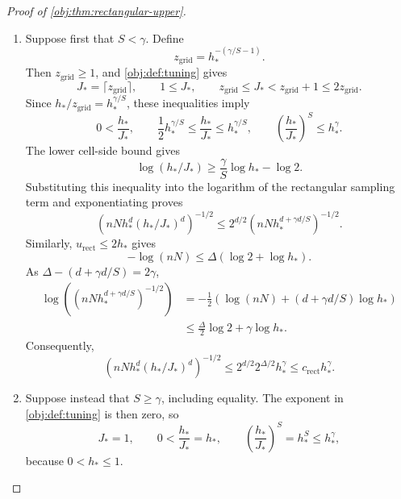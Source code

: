 \begin{proof}[Proof of \cref{obj:thm:rectangular-upper}]
\begin{enumerate}
\item Suppose first that \(S<\gamma\). Define
\[
z_{\mathrm{grid}}=h_*^{-(\gamma/S-1)}.
\]
Then \(z_{\mathrm{grid}}\ge1\), and \cref{obj:def:tuning} gives
\[
J_*=\lceil z_{\mathrm{grid}}\rceil,\qquad
1\le J_*,\qquad
z_{\mathrm{grid}}\le J_*<z_{\mathrm{grid}}+1
\le2z_{\mathrm{grid}}.
\]
Since \(h_*/z_{\mathrm{grid}}=h_*^{\gamma/S}\), these inequalities imply
\[
0<\frac{h_*}{J_*},\qquad
\frac12h_*^{\gamma/S}
\le\frac{h_*}{J_*}\le h_*^{\gamma/S},
\qquad
\left(\frac{h_*}{J_*}\right)^S\le h_*^\gamma.
\]
The lower cell-side bound gives
\[
\log(h_*/J_*)\ge\frac{\gamma}{S}\log h_*-\log2.
\]
Substituting this inequality into the logarithm of the rectangular sampling term and exponentiating proves
\[
\left(nNh_*^d(h_*/J_*)^d\right)^{-1/2}
\le
2^{d/2}
\left(nNh_*^{d+\gamma d/S}\right)^{-1/2}.
\]
Similarly, \(u_{\mathrm{rect}}\le2h_*\) gives
\[
-\log(nN)\le\Delta(\log2+\log h_*).
\]
As \(\Delta-(d+\gamma d/S)=2\gamma\),
\[
\begin{aligned}
\log\left(\left(nNh_*^{d+\gamma d/S}\right)^{-1/2}\right)
&=-\frac12\left(\log(nN)
 +(d+\gamma d/S)\log h_*\right)\\
&\le\frac{\Delta}{2}\log2+\gamma\log h_*.
\end{aligned}
\]
Consequently,
\[
\left(nNh_*^d(h_*/J_*)^d\right)^{-1/2}
\le2^{d/2}2^{\Delta/2}h_*^\gamma
\le c_{\mathrm{rect}}h_*^\gamma.
\]%

\item Suppose instead that \(S\ge\gamma\), including equality. The exponent in
\cref{obj:def:tuning} is then zero, so
\[
J_*=1,\qquad
0<\frac{h_*}{J_*}=h_*,
\qquad
\left(\frac{h_*}{J_*}\right)^S
=h_*^S\le h_*^\gamma,
\]
because \(0<h_*\le1\).


\end{enumerate}
\end{proof}
